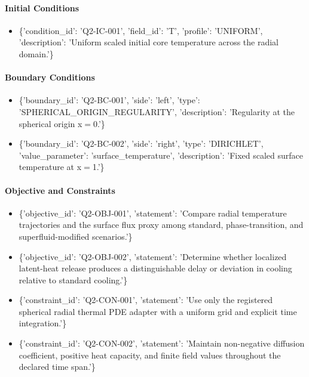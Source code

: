\documentclass[11pt]{article}
\begin{document}
\paragraph{Initial Conditions}
\begin{itemize}\raggedright
\item \{'condition\_\allowbreak{}id': 'Q2-IC-001', 'field\_\allowbreak{}id': 'T', 'profile': 'UNIFORM', 'description': 'Uniform scaled initial core temperature across the radial domain.'\}
\end{itemize}

\paragraph{Boundary Conditions}
\begin{itemize}\raggedright
\item \{'boundary\_\allowbreak{}id': 'Q2-BC-001', 'side': 'left', 'type': 'SPHERICAL\_\allowbreak{}ORIGIN\_\allowbreak{}REGULARITY', 'description': 'Regularity at the spherical origin x\ensuremath{=}0.'\}
\item \{'boundary\_\allowbreak{}id': 'Q2-BC-002', 'side': 'right', 'type': 'DIRICHLET', 'value\_\allowbreak{}parameter': 'surface\_\allowbreak{}temperature', 'description': 'Fixed scaled surface temperature at x\ensuremath{=}1.'\}
\end{itemize}

\paragraph{Objective and Constraints}
\begin{itemize}\raggedright
\item \{'objective\_\allowbreak{}id': 'Q2-OBJ-001', 'statement': 'Compare radial temperature trajectories and the surface flux proxy among standard, phase-transition, and superfluid-modified scenarios.'\}
\item \{'objective\_\allowbreak{}id': 'Q2-OBJ-002', 'statement': 'Determine whether localized latent-heat release produces a distinguishable delay or deviation in cooling relative to standard cooling.'\}
\item \{'constraint\_\allowbreak{}id': 'Q2-CON-001', 'statement': 'Use only the registered spherical radial thermal PDE adapter with a uniform grid and explicit time integration.'\}
\item \{'constraint\_\allowbreak{}id': 'Q2-CON-002', 'statement': 'Maintain non-negative diffusion coefficient, positive heat capacity, and finite field values throughout the declared time span.'\}
\end{itemize}
\end{document}
